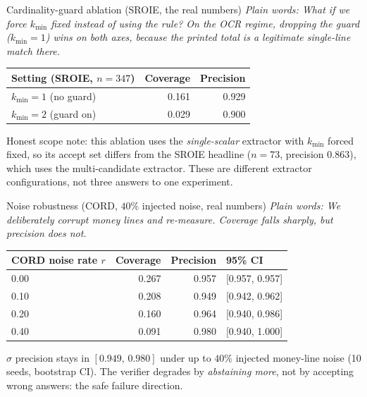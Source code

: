 \documentclass[aspectratio=169]{beamer}
\newcommand{\keybox}[1]{\begin{center}\colorbox{grey!15}{\parbox{0.92\linewidth}{\centering #1}}\end{center}}
\newcommand{\plain}[1]{\textit{\textcolor{sig}{Plain words:} #1}}
\begin{document}
\begin{frame}{Cardinality-guard ablation (SROIE, the real numbers)}
\plain{What if we force $k_{\min}$ fixed instead of using the rule?
On the OCR regime, dropping the guard ($k_{\min}{=}1$) wins on
\emph{both} axes, because the printed total is a legitimate
single-line match there.}
\vspace{0.3em}
\begin{center}\small
\begin{tabular}{lrr}
\hline
Setting (SROIE, $n{=}347$) & Coverage & Precision \\
\hline
$k_{\min}{=}1$ (no guard) & 0.161 & 0.929 \\
$k_{\min}{=}2$ (guard on) & 0.029 & 0.900 \\
\hline
\end{tabular}
\end{center}
\vspace{0.3em}
\keybox{Honest scope note: this ablation uses the
\emph{single-scalar} extractor with $k_{\min}$ forced fixed, so its
accept set differs from the SROIE headline ($n{=}73$, precision
$0.863$), which uses the multi-candidate extractor. These are
different extractor configurations, not three answers to one
experiment.}
\end{frame}

\begin{frame}{Noise robustness (CORD, $40\%$ injected noise, real numbers)}
\plain{We deliberately corrupt money lines and re-measure. Coverage
falls sharply, but precision does \emph{not}.}
\vspace{0.3em}
\begin{center}\small
\begin{tabular}{lrrl}
\hline
CORD noise rate $r$ & Coverage & Precision & 95\% CI \\
\hline
0.00 & 0.267 & 0.957 & [0.957, 0.957] \\
0.10 & 0.208 & 0.949 & [0.942, 0.962] \\
0.20 & 0.160 & 0.964 & [0.940, 0.986] \\
0.40 & 0.091 & 0.980 & [0.940, 1.000] \\
\hline
\end{tabular}
\end{center}
\vspace{0.3em}
\keybox{$\sigma$ precision stays in $[0.949,\,0.980]$ under up to
$40\%$ injected money-line noise (10 seeds, bootstrap CI). The
verifier degrades by \emph{abstaining more}, not by accepting
wrong answers: the safe failure direction.}
\end{frame}
\end{document}
